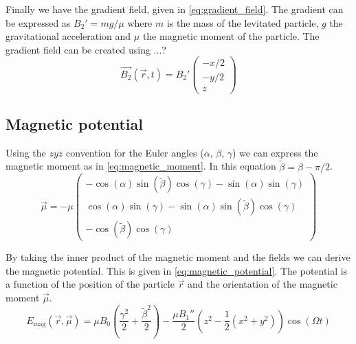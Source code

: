 Finally we have the gradient field, given in \autoref{eq:gradient_field}. The gradient can be expressed as $B_2' = mg/\mu$ where $m$ is the mass of the levitated particle, $g$ the gravitational acceleration and $\mu$ the magnetic moment of the particle. The gradient field can be created using ...?
\begin{equation}
    \vec{B_2}(\vec{r}, t) = B_2' \begin{pmatrix}
        -x / 2 \\
        -y / 2 \\
        z
    \end{pmatrix}
    \label{eq:gradient_field}
\end{equation}

\subsection{Magnetic potential}
\label{subsec:magnetic_moment}
Using the $zyz$ convention for the Euler angles ($\alpha$, $\beta$, $\gamma$) we can express the magnetic moment as in \autoref{eq:magnetic_moment}. In this equation $\tilde\beta = \beta - \pi/2$.
\begin{equation}
    \vec{\mu} = -\mu \begin{pmatrix}
        -\cos(\alpha)\sin(\tilde\beta)\cos(\gamma) - \sin(\alpha)\sin(\gamma) \\
        \cos(\alpha)\sin(\gamma) - \sin(\alpha)\sin(\tilde\beta)\cos(\gamma) \\
        -\cos(\tilde\beta)\cos(\gamma)
    \end{pmatrix}
    \label{eq:magnetic_moment}
\end{equation}

By taking the inner product of the magnetic moment and the fields we can derive the magnetic potential. This is given in \autoref{eq:magnetic_potential}. The potential is a function of the position of the particle $\vec{r}$ and the orientation of the magnetic moment $\vec{\mu}$.
\begin{equation}
    E_\text{mag}(\vec{r}, \vec{\mu}) = \mu B_0 \left(\frac{\gamma^2}{2} + \frac{\tilde\beta^2}{2}\right) - \frac{\mu B_1''}{2} \left(z^2 - \frac{1}{2}\left(x^2 + y^2\right)\right)\cos(\Omega t)
    \label{eq:magnetic_potential}
\end{equation}

